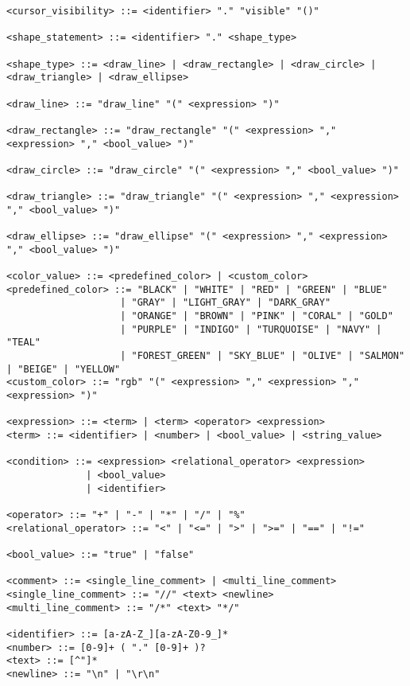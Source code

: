 \documentclass[12pt,a4paper]{report}
\begin{document}
\begin{lstlisting}
<cursor_visibility> ::= <identifier> "." "visible" "()"

<shape_statement> ::= <identifier> "." <shape_type>

<shape_type> ::= <draw_line> | <draw_rectangle> | <draw_circle> | <draw_triangle> | <draw_ellipse>

<draw_line> ::= "draw_line" "(" <expression> ")"

<draw_rectangle> ::= "draw_rectangle" "(" <expression> "," <expression> "," <bool_value> ")"

<draw_circle> ::= "draw_circle" "(" <expression> "," <bool_value> ")"

<draw_triangle> ::= "draw_triangle" "(" <expression> "," <expression> "," <bool_value> ")"

<draw_ellipse> ::= "draw_ellipse" "(" <expression> "," <expression> "," <bool_value> ")"

<color_value> ::= <predefined_color> | <custom_color>
<predefined_color> ::= "BLACK" | "WHITE" | "RED" | "GREEN" | "BLUE"
                    | "GRAY" | "LIGHT_GRAY" | "DARK_GRAY"
                    | "ORANGE" | "BROWN" | "PINK" | "CORAL" | "GOLD"
                    | "PURPLE" | "INDIGO" | "TURQUOISE" | "NAVY" | "TEAL"
                    | "FOREST_GREEN" | "SKY_BLUE" | "OLIVE" | "SALMON" | "BEIGE" | "YELLOW"
<custom_color> ::= "rgb" "(" <expression> "," <expression> "," <expression> ")"

<expression> ::= <term> | <term> <operator> <expression>
<term> ::= <identifier> | <number> | <bool_value> | <string_value>

<condition> ::= <expression> <relational_operator> <expression>
              | <bool_value>
              | <identifier>

<operator> ::= "+" | "-" | "*" | "/" | "%"
<relational_operator> ::= "<" | "<=" | ">" | ">=" | "==" | "!="

<bool_value> ::= "true" | "false"

<comment> ::= <single_line_comment> | <multi_line_comment>
<single_line_comment> ::= "//" <text> <newline>
<multi_line_comment> ::= "/*" <text> "*/"

<identifier> ::= [a-zA-Z_][a-zA-Z0-9_]*
<number> ::= [0-9]+ ( "." [0-9]+ )?
<text> ::= [^"]*
<newline> ::= "\n" | "\r\n"
\end{lstlisting}
\end{document}
